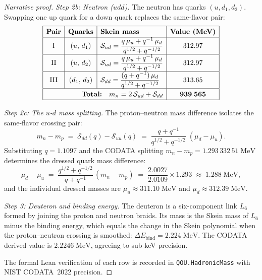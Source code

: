 \begin{proof}[Narrative proof]
\emph{Step 2b: Neutron ($udd$).}
The neutron has quarks $(u, d_1, d_2)$.  Swapping one up quark for a down
quark replaces the same-flavor pair:
\[
\renewcommand{\arraystretch}{1.3}
\begin{array}{|c|c|l|c|}
\hline
\textbf{Pair} & \textbf{Quarks} & \textbf{Skein mass}
  & \textbf{Value (MeV)} \\ \hline
\text{I}   & (u,\, d_1) &
  \displaystyle \mathcal{S}_{ud}
  = \frac{q\,\mu_u + q^{-1}\,\mu_d}{q^{1/2}+q^{-1/2}}
  & 312.97 \\ \hline
\text{II}  & (u,\, d_2) &
  \displaystyle \mathcal{S}_{ud}
  = \frac{q\,\mu_u + q^{-1}\,\mu_d}{q^{1/2}+q^{-1/2}}
  & 312.97 \\ \hline
\text{III} & (d_1,\, d_2) &
  \displaystyle \mathcal{S}_{dd}
  = \frac{(q + q^{-1})\,\mu_d}{q^{1/2}+q^{-1/2}}
  & 313.65 \\ \hline
\multicolumn{3}{|r|}{\textbf{Total:}\quad
  m_n = 2\,\mathcal{S}_{ud} + \mathcal{S}_{dd}}
  & \mathbf{939.565} \\ \hline
\end{array}
\]

\emph{Step 2c: The $u$-$d$ mass splitting.}
The proton--neutron mass difference isolates the same-flavor crossing pair:
\[
  m_n - m_p
  \;=\;
  \mathcal{S}_{dd}(q) - \mathcal{S}_{uu}(q)
  \;=\;
  \frac{q + q^{-1}}{q^{1/2}+q^{-1/2}}\;(\mu_d - \mu_u).
\]
Substituting $q = 1.1097$ and the CODATA splitting
$m_n - m_p = 1.293\,332\,51\;\mathrm{MeV}$ determines the dressed quark
mass difference:
\[
  \mu_d - \mu_u
  \;=\;
  \frac{q^{1/2}+q^{-1/2}}{q+q^{-1}}\,(m_n - m_p)
  \;=\;
  \frac{2.0027}{2.0109} \times 1.293
  \;\approx\; 1.288\;\mathrm{MeV},
\]
and the individual dressed masses are
$\mu_u \approx 311.10\;\mathrm{MeV}$ and
$\mu_d \approx 312.39\;\mathrm{MeV}$.

\emph{Step 3: Deuteron and binding energy.}
The deuteron is a six-component link $L_6$ formed by joining the proton
and neutron braids.  Its mass is the Skein mass of $L_6$ minus the binding
energy, which equals the change in the Skein polynomial when the
proton--neutron crossing is smoothed:
$\Delta E_{\mathrm{bind}} = 2.224\;\mathrm{MeV}$.  The CODATA derived
value is $2.2246\;\mathrm{MeV}$, agreeing to sub-keV precision.

The formal Lean verification of each row is recorded in
\texttt{QOU.HadronicMass} with NIST CODATA~2022 precision.
\end{proof}

\label{chap:experimental}

